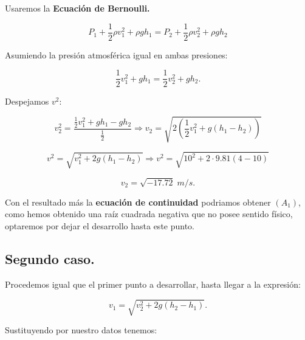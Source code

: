 \documentclass[a4paper,12pt]{article} %
\begin{document}
\begin{justify}
    Usaremos la \textbf{Ecuación de Bernoulli.}
\end{justify}

\[P_1 + \frac{1}{2} \rho v^2_1 + \rho g h_1 = P_2 + \frac{1}{2} \rho v^2_2 + \rho g h_2\]

\vspace{\baselineskip}

\begin{justify}
    Asumiendo la presión atmosférica igual en ambas presiones:
\end{justify}

\[\frac{1}{2}v^2_1 + gh_1 = \frac{1}{2}v^2_2 + g h_2.\]

\begin{justify}
    Despejamos \(v^2\):
\end{justify}

\[v^2_2 = \frac{\frac{1}{2} v^2_1 + g h_1 - g h_2 }{\frac{1}{2}} \Rightarrow v_2 = \sqrt{2 \left(\frac{1}{2} v^2_1 + g \left(h_1 - h_2\right)\right)} \]

\vspace{\baselineskip}

\[v^2 = \sqrt{ v^2_1 + 2g\left(h_1 - h_2\right) } \Rightarrow v^2 = \sqrt{ 10^2 + 2 \cdot 9.81 \left(4 - 10\right) }\]

\[\boxed{v_2 = \sqrt{-17.72} \; m/s.}\]


\begin{justify}
    Con el resultado más la \textbf{ecuación de continuidad} podriamos obtener \((A_1)\), como hemos obtenido una raíz cuadrada negativa que no posee 
    sentido físico, optaremos por dejar el desarrollo hasta este punto.
\end{justify}

\subsection{Segundo caso.}

\begin{justify}
    Procedemos igual que el primer punto a desarrollar, hasta llegar a la expresión:
\end{justify}

\[v_1 = \sqrt{v^2_2 + 2g\left(h_2 - h_1\right)}.\]

\newpage


\begin{justify}
    Sustituyendo por nuestro datos tenemos:
\end{justify}
\end{document}
